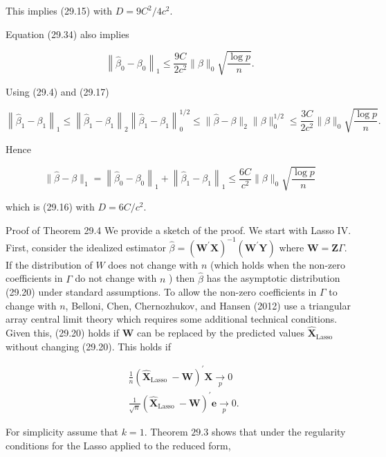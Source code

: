 \documentclass[10pt]{article}
\begin{document}
This implies (29.15) with $D=9 C^{2} / 4 c^{2}$.

Equation (29.34) also implies

$$
\left\|\widehat{\beta}_{0}-\beta_{0}\right\|_{1} \leq \frac{9 C}{2 c^{2}}\|\beta\|_{0} \sqrt{\frac{\log p}{n}} .
$$

Using (29.4) and (29.17)

$$
\left\|\widehat{\beta}_{1}-\beta_{1}\right\|_{1} \leq\left\|\widehat{\beta}_{1}-\beta_{1}\right\|_{2}\left\|\widehat{\beta}_{1}-\beta_{1}\right\|_{0}^{1 / 2} \leq\|\widehat{\beta}-\beta\|_{2}\|\beta\|_{0}^{1 / 2} \leq \frac{3 C}{2 c^{2}}\|\beta\|_{0} \sqrt{\frac{\log p}{n}} .
$$

Hence

$$
\|\widehat{\beta}-\beta\|_{1}=\left\|\widehat{\beta}_{0}-\beta_{0}\right\|_{1}+\left\|\widehat{\beta}_{1}-\beta_{1}\right\|_{1} \leq \frac{6 C}{c^{2}}\|\beta\|_{0} \sqrt{\frac{\log p}{n}}
$$

which is (29.16) with $D=6 C / c^{2}$.

Proof of Theorem 29.4 We provide a sketch of the proof. We start with Lasso IV. First, consider the idealized estimator $\widehat{\beta}=\left(\boldsymbol{W}^{\prime} \boldsymbol{X}\right)^{-1}\left(\boldsymbol{W}^{\prime} \boldsymbol{Y}\right)$ where $\boldsymbol{W}=\boldsymbol{Z} \Gamma$. If the distribution of $W$ does not change with $n$ (which holds when the non-zero coefficients in $\Gamma$ do not change with $n$ ) then $\widehat{\beta}$ has the asymptotic distribution (29.20) under standard assumptions. To allow the non-zero coefficients in $\Gamma$ to change with $n$, Belloni, Chen, Chernozhukov, and Hansen (2012) use a triangular array central limit theory which requires some additional technical conditions. Given this, (29.20) holds if $\boldsymbol{W}$ can be replaced by the predicted values $\widehat{\boldsymbol{X}}_{\text {Lasso }}$ without changing (29.20). This holds if

$$
\begin{aligned}
&\frac{1}{n}\left(\widehat{\boldsymbol{X}}_{\text {Lasso }}-\boldsymbol{W}\right)^{\prime} \boldsymbol{X} \underset{p}{\longrightarrow} 0 \\
&\frac{1}{\sqrt{n}}\left(\widehat{\boldsymbol{X}}_{\text {Lasso }}-\boldsymbol{W}\right)^{\prime} \boldsymbol{e} \underset{p}{\longrightarrow} 0 .
\end{aligned}
$$

For simplicity assume that $k=1$. Theorem $29.3$ shows that under the regularity conditions for the Lasso applied to the reduced form,
\end{document}
